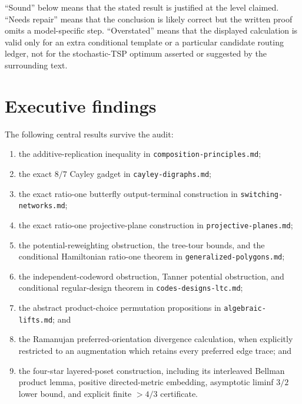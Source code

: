 \documentclass[11pt,a4paper]{article}
\begin{document}
“Sound” below means that the stated result is justified at the level claimed. “Needs repair” means that the conclusion is likely correct but the written proof omits a model-specific step.  “Overstated” means that the displayed calculation is valid only for an extra conditional template or a particular candidate routing ledger, not for the stochastic-TSP optimum asserted or suggested by the surrounding text.


\section*{Executive findings}

The following central results survive the audit:


\begin{enumerate}

\item the additive-replication inequality in \nolinkurl{composition-principles.md};

\item the exact \(8/7\) Cayley gadget in \nolinkurl{cayley-digraphs.md};

\item the exact ratio-one butterfly output-terminal construction in \nolinkurl{switching-networks.md};

\item the exact ratio-one projective-plane construction in \nolinkurl{projective-planes.md};

\item the potential-reweighting obstruction, the tree-tour bounds, and the conditional Hamiltonian ratio-one theorem in \nolinkurl{generalized-polygons.md};

\item the independent-codeword obstruction, Tanner potential obstruction, and conditional regular-design theorem in \nolinkurl{codes-designs-ltc.md};

\item the abstract product-choice permutation propositions in \nolinkurl{algebraic-lifts.md}; and

\item the Ramanujan preferred-orientation divergence calculation, when explicitly restricted to an augmentation which retains every preferred edge trace; and

\item the four-star layered-poset construction, including its interleaved Bellman product lemma, positive directed-metric embedding, asymptotic liminf \(3/2\) lower bound, and explicit finite \(>4/3\) certificate.

\end{enumerate}
\end{document}
